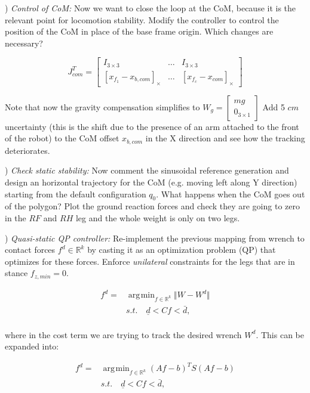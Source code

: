 \documentclass{report}
\newcommand{\Rnum}{\mathbb{R}} %
\newcommand{\mat}[1]{\ensuremath{\begin{bmatrix}#1\end{bmatrix}}}	%
\DeclareMathOperator*{\argmin}{\arg\!\min}				%
\begin{document}
\quad

) \textit{Control of CoM:}
Now we want to close the loop at the CoM, because it is the relevant point for locomotion stability. Modify the controller to control the position of the CoM in place of the base frame origin.
Which changes are necessary?


\begin{equation}
J_{com}^T = \mat{I_{3\times3} & \dots & I_{3\times3} \\
	[x_{f_1} - x_{b,com}]_{\times} & \dots & [x_{f_c} - x_{com}]_{\times}}
\end{equation}

Note that now  the gravity compensation simplifies to $W_g = \mat{ mg \\ 0_{3 \times 1} }$
Add 5 $cm$ uncertainty (this is the shift due to the presence of an arm attached to the front of the robot) to the CoM offset $x_{b,com}$ in the X direction and see how the tracking deteriorates. 

\quad

\quad

) \textit{Check static stability:}
Now comment the sinusoidal reference generation and design an horizontal trajectory for the 
CoM (e.g. moving left along Y direction) starting from the default configuration $q_0$. 
What happens when the CoM goes out of the polygon?
Plot the ground reaction forces and check they are going to zero in the $RF$ and $RH$ leg and the whole weight is only on two legs.

) \textit{Quasi-static QP controller:}
Re-implement the previous mapping from wrench to contact forces $f^d \in \Rnum^k$
by casting it as an optimization problem (QP) that optimizes for these forces. 
Enforce \textit{unilateral} constraints for the legs that are in stance $f_{z,min} = 0$. 

\begin{equation} 
\begin{aligned} 
f^d = & \argmin_{f \in \Rnum^k} \Vert W- W^d\Vert\\
& s.t. \quad \underline{d} < C f < \bar{d},\\
\end{aligned} 
\label{eq:min_prob}
\end{equation}

where in the cost term we are trying to track the desired wrench $W^d$. 
This can be expanded into:

\begin{equation} 
\begin{aligned} 
f^d = & \argmin_{f \in \Rnum^k}  (Af-b)^T S (Af-b)\\
& s.t. \quad \underline{d} < C f < \bar{d},\\
\end{aligned} 
\label{eq:min_prob}
\end{equation}
\end{document}
